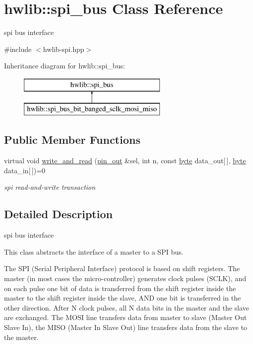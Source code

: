 \hypertarget{classhwlib_1_1spi__bus}{}\section{hwlib\+:\+:spi\+\_\+bus Class Reference}
\label{classhwlib_1_1spi__bus}


spi bus interface  




{\ttfamily \#include $<$hwlib-\/spi.\+hpp$>$}

Inheritance diagram for hwlib\+:\+:spi\+\_\+bus\+:\begin{figure}[H]
\begin{center}
\leavevmode
\includegraphics[height=2.000000cm]{classhwlib_1_1spi__bus}
\end{center}
\end{figure}
\subsection*{Public Member Functions}
\begin{DoxyCompactItemize}
\item 
virtual void \hyperlink{classhwlib_1_1spi__bus_ae6e20e12c547c64b6456997d938b6943}{write\+\_\+and\+\_\+read} (\hyperlink{classhwlib_1_1pin__out}{pin\+\_\+out} \&sel, int n, const \hyperlink{hwlib-defines_8hpp_ab8ef12fab634c171394422d0ee8baf94}{byte} data\+\_\+out\mbox{[}$\,$\mbox{]}, \hyperlink{hwlib-defines_8hpp_ab8ef12fab634c171394422d0ee8baf94}{byte} data\+\_\+in\mbox{[}$\,$\mbox{]})=0
\begin{DoxyCompactList}\small\item\em spi read-\/and-\/write transaction \end{DoxyCompactList}\end{DoxyCompactItemize}


\subsection{Detailed Description}
spi bus interface 

This class abstracts the interface of a master to a S\+PI bus.

The S\+PI (Serial Peripheral Interface) protocol is based on shift registers. The master (in most cases the micro-\/controller) generates clock pulses (S\+C\+LK), and on each pulse one bit of data is transferred from the shift register inside the master to the shift register inside the slave, A\+ND one bit is transferred in the other direction. After N clock pulses, all N data bits in the master and the slave are exchanged. The M\+O\+SI line transfers data from master to slave (Master Out Slave In), the M\+I\+SO (Master In Slave Out) line transfers data from the slave to the master.




